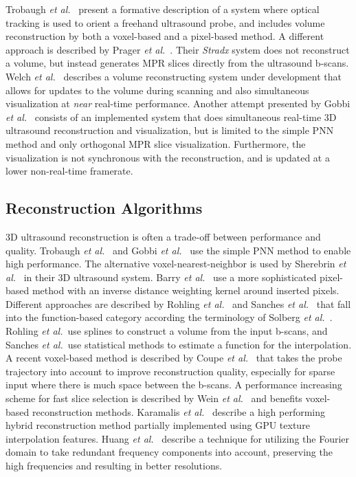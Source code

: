 Trobaugh \textit{et al.}\ \cite{trobaugh1994} present a formative description of a system where optical tracking is used to orient a freehand ultrasound probe, and includes volume reconstruction by both a voxel-based and a pixel-based method. A different approach is described by Prager \textit{et al.}\ \cite{prager1998}. Their \textit{Stradx} system does not reconstruct a volume, but instead generates MPR slices directly from the ultrasound b-scans. Welch \textit{et al.}\ \cite{welch2000} describes a volume reconstructing system under development that allows for updates to the volume during scanning and also simultaneous visualization at \emph{near} real-time performance. Another attempt presented by Gobbi \textit{et al.}\ \cite{gobbi2002} consists of an implemented system that does simultaneous real-time 3D ultrasound reconstruction and visualization, but is limited to the simple PNN method and only orthogonal MPR slice visualization. Furthermore, the visualization is not synchronous with the reconstruction, and is updated at a lower non-real-time framerate.

\subsection{Reconstruction Algorithms}

3D ultrasound reconstruction is often a trade-off between performance and quality. Trobaugh \textit{et al.}\ \cite{trobaugh1994} and Gobbi \textit{et al.}\ \cite{gobbi2002} use the simple PNN method to enable high performance. The alternative voxel-nearest-neighbor is used by Sherebrin \textit{et al.}\ \cite{sherebrin1996} in their 3D ultrasound system. Barry \textit{et al.}\ \cite{barry1997} use a more sophisticated pixel-based method with an inverse distance weighting kernel around inserted pixels. Different approaches are described by Rohling \textit{et al.}\ \cite{rohling1999} and Sanches \textit{et al.}\ \cite{sanches2000} that fall into the function-based category according the terminology of Solberg \textit{et al.}\ \cite{solberg2007}. Rohling \textit{et al.}\ use splines to construct a volume from the input b-scans, and Sanches \textit{et al.}\ use statistical methods to estimate a function for the interpolation. A recent voxel-based method is described by Coupe \textit{et al.}\ \cite{coupe2005} that takes the probe trajectory into account to improve reconstruction quality, especially for sparse input where there is much space between the b-scans. A performance increasing scheme for fast slice selection is described by Wein \textit{et al.}\ \cite{wein2006} and benefits voxel-based reconstruction methods. Karamalis \textit{et al.}\ \cite{karamalis2009} describe a high performing hybrid reconstruction method partially implemented using GPU texture interpolation features. Huang \textit{et al.}\ \cite{huang2005} describe a technique for utilizing the Fourier domain to take redundant frequency components into account, preserving the high frequencies and resulting in better resolutions.